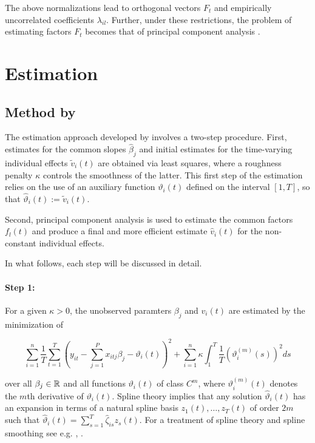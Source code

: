 The above normalizations lead to orthogonal vectors $F_t$ and empirically uncorrelated coefficients  $\lambda_{il}$. Further, under these restrictions, the problem of estimating factors $F_t$ becomes that of principal component analysis  \citep{kneip2012new}.


\section{Estimation}

\subsection{Method by \citet{kneip2012new}}
The estimation approach developed by \citet{kneip2012new} involves a two-step procedure. First, estimates for the common slopes  $\hat{\beta}_j$ and initial estimates for the time-varying individual effects $\tilde{v}_i(t)$ are obtained via least squares, where a roughness penalty $\kappa$ controls the smoothness of the latter. This first step of the estimation relies on the use of an auxiliary function $\vartheta_i(t)$ defined on the interval $[1,T]$, so that 
$\hat{\vartheta}_i(t) := \tilde{v}_i(t)$.

Second, principal component analysis is used to estimate the common factors $f_l(t)$ and produce a final and more efficient estimate $\hat{v}_i(t)$ for the non-constant individual effects. 

In what follows, each step will be discussed in detail. 

\paragraph{Step 1:} For a given $\kappa >0 $, the unobserved paramters $\beta_j$ and $v_i(t)$ are estimated by the minimization of


\begin{equation}\label{obj_kneip1}
    \sum_{i=1}^n \frac{1}{T} \sum_{t=1}^T\left(y_{i t}-\sum_{j=1}^P x_{i t j} \beta_j-\vartheta_i(t)\right)^2+\sum_{i=1}^n \kappa \int_1^T \frac{1}{T}\left(\vartheta_i^{(m)}(s)\right)^2 d s
\end{equation}

over all $\beta_j \in \mathbb{R}$ and all functions $\vartheta_i(t)$ of class $C^m$, where $\vartheta^{(m)}_i(t)$ denotes the $m$th derivative of $\vartheta_i(t)$. Spline theory implies that any solution $\hat{\vartheta}_i(t)$ has an expansion in terms of a natural spline basis $z_1(t), \ldots, z_T(t)$ of order $2m$ such that $\hat{\vartheta}_i(t) = \sum_{s=1}^T \hat{\zeta}_{is} z_s(t)$. For a treatment of spline theory and spline smoothing see e.g. \citet{eubank1999nonparametric}, \citet{wasserman2006all}.


